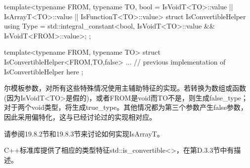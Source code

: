 \begin{cpp}
template<typename FROM, typename TO, bool = IsVoidT<TO>::value
								|| IsArrayT<TO>::value
								|| IsFunctionT<TO>::value>
struct IsConvertibleHelper {
	using Type = std::integral_constant<bool,
	IsVoidT<TO>::value
	&& IsVoidT<FROM>::value>;
};

template<typename FROM, typename TO>
struct IsConvertibleHelper<FROM,TO,false> {
	... // previous implementation of IsConvertibleHelper here
};
\end{cpp}

尔模板参数，对所有这些特殊情况使用主辅助特征的实现。若转换为数组或函数(因为IsVoidT<TO>是假的)，或者FROM是void而TO不是，则生成false\_type；对于两个void类型，将生成true\_type。其他情况都为第三个参数产生false参数，因此采用偏特化，这与已经讨论过的实现相对应。

请参阅19.8.2节和19.8.3节来讨论如何实现IsArrayT。

C++标准库提供了相应的类型特征std::is\_convertible<>，在第D.3.3节中有描述。



